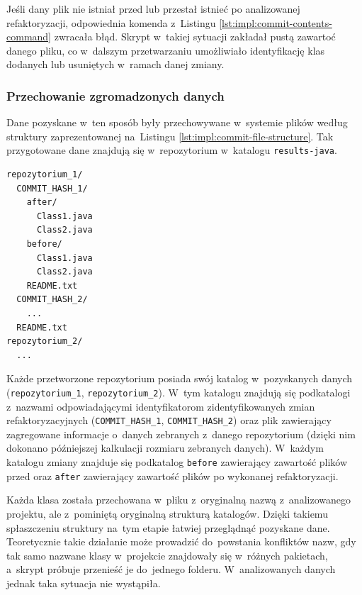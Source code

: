 \documentclass[twoside]{praca}
\begin{document}
Jeśli dany plik nie istniał przed lub przestał istnieć po analizowanej refaktoryzacji, odpowiednia komenda z~Listingu \ref{lst:impl:commit-contents-command} zwracała błąd. Skrypt w~takiej sytuacji zakładał pustą zawartoć danego pliku, co w~dalszym przetwarzaniu umożliwiało identyfikację klas dodanych lub usuniętych w~ramach danej zmiany.

\subsubsection{Przechowanie zgromadzonych danych}
Dane pozyskane w~ten sposób były przechowywane w~systemie plików według struktury zaprezentowanej na~Listingu \ref{lst:impl:commit-file-structure}. Tak przygotowane dane znajdują się w~repozytorium \cite{fracz:refactor-extractor} w~katalogu \texttt{results-java}.

\begin{lstlisting}[frame=single,caption={Struktura danych przechowujących kod poddany refaktoryazji po przetworzeniu zidentyfikowanych \textit{commitów} wprowadzających refaktoryzację},captionpos=b,label={lst:impl:commit-file-structure}]
repozytorium_1/
  COMMIT_HASH_1/
    after/
      Class1.java
      Class2.java
    before/
      Class1.java
      Class2.java
    README.txt
  COMMIT_HASH_2/
    ...
  README.txt
repozytorium_2/
  ...
\end{lstlisting}

Każde przetworzone repozytorium posiada swój katalog w~pozyskanych danych (\texttt{repozytorium\_1}, \texttt{repozytorium\_2}). W~tym katalogu znajdują się podkatalogi z~nazwami odpowiadającymi identyfikatorom zidentyfikowanych zmian refaktoryzacyjnych (\texttt{COMMIT\_HASH\_1}, \texttt{COMMIT\_HASH\_2}) oraz plik  zawierający zagregowane informacje o~danych zebranych z~danego repozytorium (dzięki nim dokonano późniejszej kalkulacji rozmiaru zebranych danych). W~każdym katalogu zmiany znajduje się podkatalog \texttt{before} zawierający zawartość plików przed oraz \texttt{after} zawierający zawartość plików po wykonanej refaktoryzacji. 

Każda klasa została przechowana w~pliku z~oryginalną nazwą z~analizowanego projektu, ale z~pominiętą oryginalną strukturą katalogów. Dzięki takiemu spłaszczeniu struktury na~tym etapie łatwiej przeglądnąć pozyskane dane. Teoretycznie takie działanie może prowadzić do~powstania konfliktów nazw, gdy tak samo nazwane klasy w~projekcie znajdowały się w~różnych pakietach, a~skrypt próbuje przenieść je do~jednego folderu. W~analizowanych danych jednak taka sytuacja nie wystąpiła.
\end{document}
